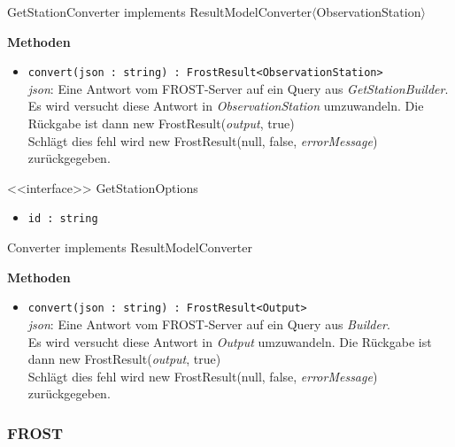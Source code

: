 \begin{Class}{GetStationConverter implements ResultModelConverter$\langle$ObservationStation$\rangle$}

    \textbf{Methoden}
    \begin{itemize}
        \item \texttt{convert(json : string) : FrostResult<ObservationStation>}
        \\ \emph{json}: Eine Antwort vom FROST-Server auf ein Query aus \emph{GetStationBuilder}.
        \\ Es wird versucht diese Antwort in \emph{ObservationStation} umzuwandeln.
        Die Rückgabe ist dann new FrostResult(\emph{output}, true)
        \\ Schlägt dies fehl wird new FrostResult(null, false, \emph{errorMessage}) zurückgegeben.
    \end{itemize}
\end{Class}

\begin{Class}{<<interface>> GetStationOptions}
    \begin{itemize}
        \item \texttt{id : string}
    \end{itemize}
\end{Class}

\begin{Class}{Converter implements ResultModelConverter}

    \textbf{Methoden}
    \begin{itemize}
        \item \texttt{convert(json : string) : FrostResult<Output>}
        \\ \emph{json}: Eine Antwort vom FROST-Server auf ein Query aus \emph{Builder}.
        \\ Es wird versucht diese Antwort in \emph{Output} umzuwandeln.
        Die Rückgabe ist dann new FrostResult(\emph{output}, true)
        \\ Schlägt dies fehl wird new FrostResult(null, false, \emph{errorMessage}) zurückgegeben.
    \end{itemize}
\end{Class}

\iffalse
\subsubsection{FROST}

